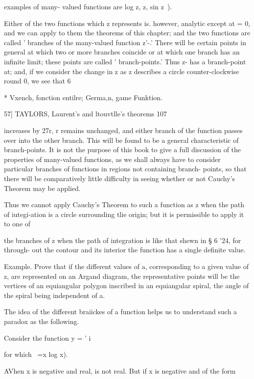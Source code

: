 {{{{examples of many- valued functions are log z, z, sin z~).

Either of the two functions which z represents is. however, analytic
except at = 0, and we can apply to them the theorems of this chapter;
and the two functions are called ' branches of the many-valued
function z'-.' There will be certain points in general at which two or
more branches coincide or at which one branch has an infinite limit;
these points are called ' branch-points.' Thus z- has a branch-point
at; and, if we consider the change in z as z describes a circle
counter-clockwise round 0, we see that 6

* Vxench, fonction entilre; Germa,n, game Funktion.

57] TAYLORS, Laurent's and ltouvtlle's theorems 107

increases by 27r, r remains unchanged, and either branch of the
function passes over into the other branch. This will be found to be a
general characteristic of branch-points. It is not the purpose of this
book to give a full discussion of the properties of many-valued
functions, as we shall always have to consider particular branches of
functions in regions not containing branch- points, so that there will
be comparatively little difficulty in seeing whether or not Cauchy's
Theorem may be applied.

Thus we cannot apply Cauchy's Theorem to such a function as z when the
path of iutegi-ation is a circle surrounding tlie origin; but it is
permissible to apply it to one of

the branches of z when the path of integration is like that shewn in §
6 '24, for through- out the contour and its interior the function has
a single definite value.

Example. Prove that if the different values of a, corresponding to a
given value of z, are represented on an Argand diagram, the
representative points will be the vertices of an equiangular polygon
inscribed in an equiangular spiral, the angle of the spiral being
independent of a.


The idea of the different braiickes of a function helps us to
understand such a paradox as the following.

Consider the function y = ' i

for which ~=x log x).

AVhen x is negative and real, is not real. But if x is negative and of
the form

}}}}
